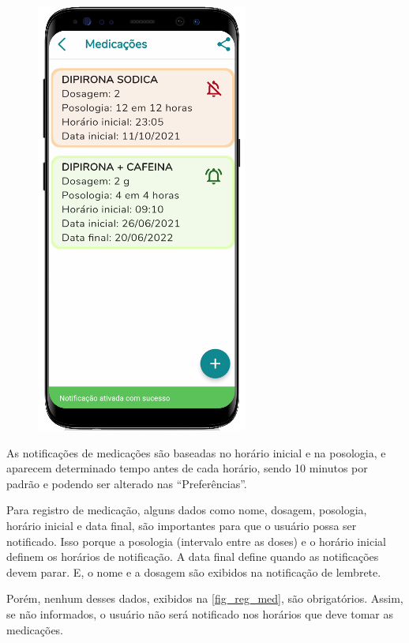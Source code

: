 \begin{figure}[htb]
\begin{minipage}{0.45\textwidth}
        \includegraphics[scale=0.66]{Imagens/desenvolvimento/app/list_med_not.png}
    \end{minipage}
\end{figure}

As notificações de medicações são baseadas no horário inicial e na posologia, e aparecem determinado tempo
antes de cada horário, sendo 10 minutos por padrão e podendo ser alterado nas “Preferências”.

Para registro de medicação, alguns dados como nome, dosagem, posologia, horário inicial e data final,
são importantes para que o usuário possa ser notificado. Isso porque a posologia (intervalo entre as doses)
e o horário inicial definem os horários de notificação. A data final define quando as notificações devem
parar. E, o nome e a dosagem são exibidos na notificação de lembrete.

Porém, nenhum desses dados, exibidos na \autoref{fig_reg_med}, são obrigatórios. Assim, se não informados,
o usuário não será notificado nos horários que deve tomar as medicações.

